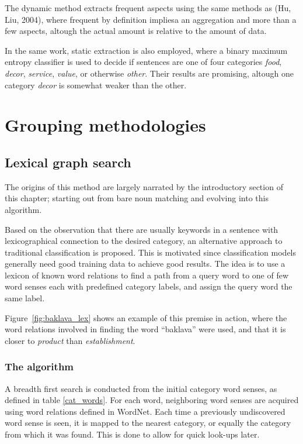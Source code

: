 \documentclass[a4paper,11pt]{kth-mag}
\begin{document}
The dynamic method extracts frequent aspects using the same methods as (Hu, Liu, 2004),
where frequent by definition impliesa an aggregation and more than a few aspects,
altough the actual amount is relative to the amount of data.

In the same work, static extraction is also employed, where a binary maximum entropy classifier
is used to decide if sentences are one of four categories \emph{food}, \emph{decor}, \emph{service}, \emph{value},
or otherwise \emph{other}.
Their results are promising, altough one category \emph{decor} is somewhat weaker than the other.

\section{Grouping methodologies}
\subsection{Lexical graph search}
The origins of this method are largely narrated by the introductory section of this chapter;
starting out from bare noun matching and evolving into this algorithm.

Based on the observation that there are usually keywords in a sentence with lexicographical
connection to the desired category, an alternative approach to traditional classification is proposed.
This is motivated since classification models generally need good training data to achieve good results.
The idea is to use a lexicon of known word relations to find a path from a query word to one of
few word senses each with predefined category labels, and assign the query word the same label.

Figure~\ref{fig:baklava_lex} shows an example of this premise in action,
where the word relations involved in finding the word ``baklava'' were used,
and that it is closer to \emph{product} than \emph{establishment}.

\subsubsection{The algorithm}
A breadth first search is conducted from the initial category word senses,
as defined in table \ref{cat_words}.
For each word, neighboring word senses are acquired using word relations
defined in WordNet. Each time a previously undiscovered word sense is seen, it is mapped
to the nearest category, or equally the category from which it was found.
This is done to allow for quick look-ups later.
\end{document}
